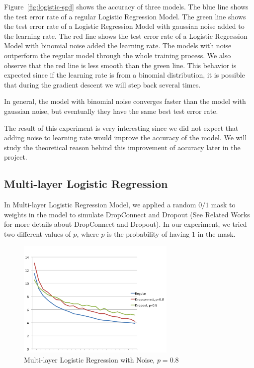 Figure~\ref{fig:logistic-sgd} shows the accuracy of three models.
The blue line shows the test error rate of a regular Logistic Regression
Model.  The green line shows the test error rate of a Logistic Regression
Model with gaussian noise added to the learning rate.  The red line shows
the test error rate of a Logistic Regression Model with binomial noise
added the learning rate.  The models with noise outperform the regular
model through the whole training process.  We also observe that the red
line is less smooth than the green line.  This behavior is expected since
if the learning rate is from a binomial distribution, it is possible that
during the gradient descent we will step back several times.

In general, the model with binomial noise converges faster than the model
with gaussian noise, but eventually they have the same best test error
rate.

The result of this experiment is very interesting since we did not
expect that adding noise to learning rate would improve the accuracy
of the model. We will study the theoretical reason behind this improvement
of accuracy later in the project.

\subsection{Multi-layer Logistic Regression}
In Multi-layer Logistic Regression Model, we applied a random $0/1$ mask to
weights in the model to simulate DropConnect and Dropout
(See Related Works for more details about DropConnect and Dropout).
In our experiment, we tried two different values of $p$, where $p$ is
the probability of having $1$ in the mask.

\begin{figure}[h]
\centering
\includegraphics[width=215pt]{figs/mlp_psmall.png}
\caption{Multi-layer Logistic Regression with Noise, $p=0.8$}
\label{fig:mlp-noise-psmall}
\end{figure}

